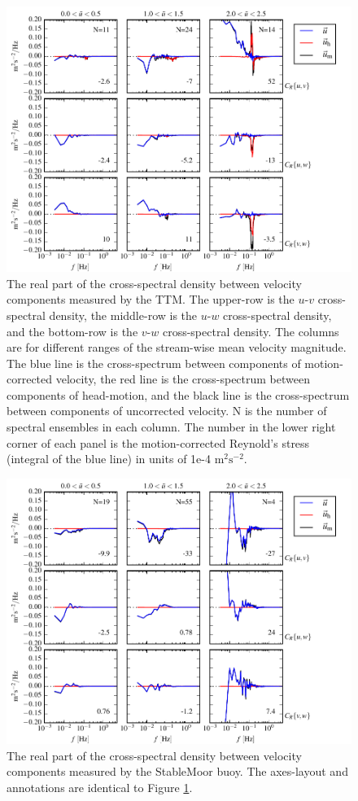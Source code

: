\documentclass[twocol]{ametsoc}
\begin{document}
\begin{figure}[t]
  \centering
  \includegraphics{StressSpec_TTM_03}
  \caption{The real part of the cross-spectral density between velocity components measured by the TTM. The upper-row is the $u$-$v$ cross-spectral density, the middle-row is the $u$-$w$ cross-spectral density, and the bottom-row is the $v$-$w$ cross-spectral density.  The columns are for different ranges of the stream-wise mean velocity magnitude. The blue line is the cross-spectrum between components of motion-corrected velocity, the red line is the cross-spectrum between components of head-motion, and the black line is the cross-spectrum between components of uncorrected velocity. N is the number of spectral ensembles in each column. The number in the lower right corner of each panel is the motion-corrected Reynold's stress (integral of the blue line) in units of 1e-4 $\mathrm{m^2s^{-2}}$.}
  \label{fig:stressspec:ttm}
\end{figure}

\begin{figure}[t]
  \centering
  \includegraphics{StressSpec_SM_03}
  \caption{The real part of the cross-spectral density between velocity components measured by the StableMoor buoy. The axes-layout and annotations are identical to Figure \ref{fig:stressspec:ttm}.}
  \label{fig:stressspec:sm}
\end{figure}
\end{document}
